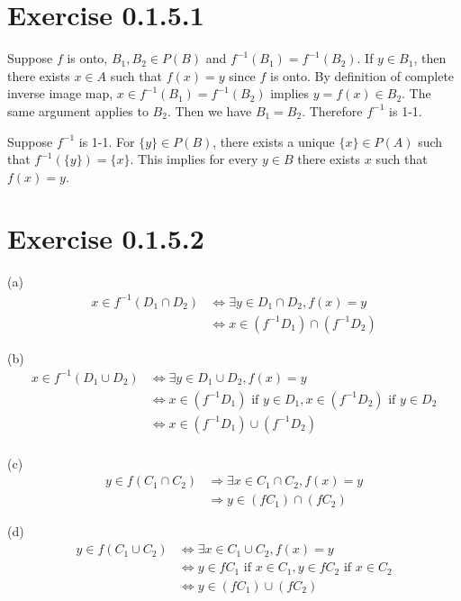\documentclass[12pt]{article}
\begin{document}
\section*{Exercise 0.1.5.1}
Suppose $f$ is onto, $B_1, B_2 \in P(B)$ and $f^{-1}(B_1) = f^{-1}(B_2)$. If $y \in B_1$, then there exists $x \in A$ such that $f(x) = y$ since $f$ is onto. By definition of complete inverse image map, $ x \in   f^{-1}(B_1) = f^{-1}(B_2)$ implies $ y = f(x) \in B_2$. The same argument applies to $B_2$. Then we have $B_1 = B_2$. Therefore $f^{-1}$ is 1-1. 

Suppose $f^{-1}$ is 1-1. For $\{y\} \in P(B)$, there exists a unique $\{x\} \in P(A)$ such that $f^{-1}(\{y\}) = \{x\}$. This implies for every $y \in B$ there exists $x$ such that $f(x) = y$.  \QED

\section*{Exercise 0.1.5.2}
(a) $$\begin{aligned}
	x \in f^{-1}(D_1 \cap D_2) &\Leftrightarrow \exists y \in D_1 \cap D_2, f(x) = y  \\
	&\Leftrightarrow x \in (f^{-1}D_1) \cap (f^{-1}D_2)	    
\end{aligned}
$$

(b) $$
\begin{aligned}
	x \in f^{-1}(D_1 \cup D_2) &\Leftrightarrow \exists y \in D_1 \cup D_2, f(x) = y  \\
	&\Leftrightarrow x \in (f^{-1}D_1) \mbox{ if } y \in D_1, x \in (f^{-1}D_2) \mbox{ if } y \in D_2 \\
	&\Leftrightarrow x \in (f^{-1}D_1) \cup (f^{-1}D_2)  \\
\end{aligned}
$$

(c) $$\begin{aligned}
	y \in f(C_1 \cap C_2) &\Rightarrow \exists x \in C_1 \cap C_2, f(x) = y \\
	&\Rightarrow y \in (fC_1) \cap (fC_2)
\end{aligned}
$$

(d) $$\begin{aligned}
	y \in f(C_1 \cup C_2) &\Leftrightarrow \exists x \in C_1 \cup C_2, f(x) = y \\
	&\Leftrightarrow y \in fC_1 \mbox{ if } x \in C_1 ,  y \in fC_2 \mbox{ if } x \in C_2 \\
	&\Leftrightarrow y \in (fC_1) \cup (fC_2)
\end{aligned}
$$
\end{document}
